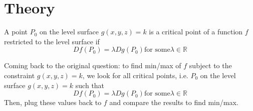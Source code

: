 \documentclass{article}
\begin{document}
\section{Theory}
A point $P_0$ on the level surface $g(x, y, z) = k$ is a critical point of a
function $f$ restricted to the level surface if 
$$Df (P_0) = \lambda Dg(P_0) \text{for some} \lambda \in \mathbb{R}$$

Coming back to the original question: to find min/max of $f$ subject to the constraint $g(x, y, z) = k$, we look for all critical points, i.e. $P_0$ on the level surface
$g(x, y, z) = k$ such that
$$Df (P_0) = \lambda Dg(P_0) \text{for some} \lambda \in \mathbb{R}$$
Then, plug these values back to $f$ and compare the results to find min/max.
\end{document}
